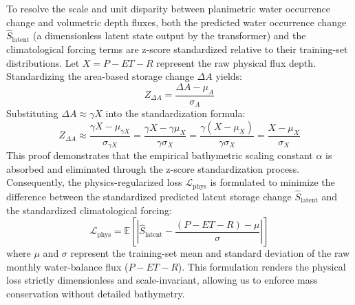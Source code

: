 \documentclass[journal]{IEEEtran}
\begin{document}
To resolve the scale and unit disparity between planimetric water occurrence change and volumetric depth fluxes, both the predicted water occurrence change $\hat{S}_{\text{latent}}$ (a dimensionless latent state output by the transformer) and the climatological forcing terms are z-score standardized relative to their training-set distributions. Let $X = P - ET - R$ represent the raw physical flux depth. Standardizing the area-based storage change $\Delta A$ yields:
\begin{equation}
Z_{\Delta A} = \frac{\Delta A - \mu_A}{\sigma_A}
\end{equation}
Substituting $\Delta A \approx \gamma X$ into the standardization formula:
\begin{equation}
Z_{\Delta A} \approx \frac{\gamma X - \mu_{\gamma X}}{\sigma_{\gamma X}} = \frac{\gamma X - \gamma \mu_X}{\gamma \sigma_X} = \frac{\gamma(X - \mu_X)}{\gamma \sigma_X} = \frac{X - \mu_X}{\sigma_X}
\end{equation}
This proof demonstrates that the empirical bathymetric scaling constant $\alpha$ is absorbed and eliminated through the z-score standardization process. Consequently, the physics-regularized loss $\mathcal{L}_{\text{phys}}$ is formulated to minimize the difference between the standardized predicted latent storage change $\hat{S}_{\text{latent}}$ and the standardized climatological forcing:
\begin{equation}
\mathcal{L}_{\text{phys}} = \mathbb{E}\left[\left|\hat{S}_{\text{latent}} - \frac{(P - ET - R) - \mu}{\sigma}\right|\right]
\end{equation}
where $\mu$ and $\sigma$ represent the training-set mean and standard deviation of the raw monthly water-balance flux ($P - ET - R$). This formulation renders the physical loss strictly dimensionless and scale-invariant, allowing us to enforce mass conservation without detailed bathymetry.
\end{document}
